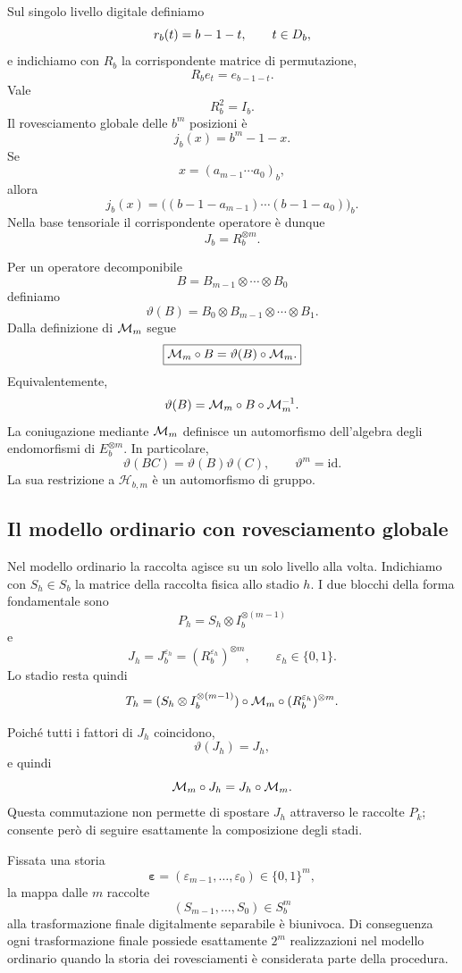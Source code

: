 	Sul singolo livello digitale definiamo
	\[
	r_b(t)=b-1-t,
	\qquad
	t\in D_b,
	\]
	e indichiamo con \(R_b\) la corrispondente matrice di permutazione,
	\[
	R_be_t=e_{b-1-t}.
	\]
	Vale
	\[
	R_b^2=I_b.
	\]
	Il rovesciamento globale delle \(b^m\) posizioni è
	\[
	j_b(x)=b^m-1-x.
	\]
	Se
	\[
	x=(a_{m-1}\cdots a_0)_b,
	\]
	allora
	\[
	j_b(x)
	=
	\bigl(
	(b-1-a_{m-1})\cdots(b-1-a_0)
	\bigr)_b.
	\]
	Nella base tensoriale il corrispondente operatore è dunque
	\[
	J_b
	=
	R_b^{\otimes m}.
	\]

	Per un operatore decomponibile
	\[
	B
	=
	B_{m-1}\otimes\cdots\otimes B_0
	\]
	definiamo
	\[
	\vartheta(B)
	=
	B_0\otimes B_{m-1}\otimes\cdots\otimes B_1.
	\]
	Dalla definizione di \(\mathcal M_m\) segue
	\[
	\boxed{
	\mathcal M_m\circ B
	=
	\vartheta(B)\circ\mathcal M_m.
	}
	\]
	Equivalentemente,
	\[
	\vartheta(B)
	=
	\mathcal M_m\circ B\circ\mathcal M_m^{-1}.
	\]
	La coniugazione mediante \(\mathcal M_m\) definisce un automorfismo
	dell'algebra degli endomorfismi di \(E_b^{\otimes m}\). In particolare,
	\[
	\vartheta(BC)
	=
	\vartheta(B)\vartheta(C),
	\qquad
	\vartheta^m=\mathrm{id}.
	\]
	La sua restrizione a \(\mathcal H_{b,m}\) è un automorfismo di gruppo.


	\subsection{Il modello ordinario con rovesciamento globale}

	Nel modello ordinario la raccolta agisce su un solo livello alla volta.
	Indichiamo con \(S_h\in S_b\) la matrice della raccolta fisica allo stadio
	\(h\). I due blocchi della forma fondamentale sono
	\[
	P_h
	=
	S_h\otimes I_b^{\otimes(m-1)}
	\]
	e
	\[
	J_h
	=
	J_b^{\varepsilon_h}
	=
	(R_b^{\varepsilon_h})^{\otimes m},
	\qquad
	\varepsilon_h\in\{0,1\}.
	\]
	Lo stadio resta quindi
	\[
		T_h
	=
	(S_h\otimes I_b^{\otimes(m-1)})
	\circ\mathcal M_m\circ
	(R_b^{\varepsilon_h})^{\otimes m}.
	\]

	Poiché tutti i fattori di \(J_h\) coincidono,
	\[
	\vartheta(J_h)=J_h,
	\]
	e quindi
	\[
	\mathcal M_m\circ J_h
	=
	J_h\circ\mathcal M_m.
	\]
	Questa commutazione non permette di spostare \(J_h\) attraverso le raccolte
	\(P_k\); consente però di seguire esattamente la composizione degli stadi.

	\begin{proposition}
		\label{prop:molteplicita-ordinaria}
		Fissata una storia
		\[
		\boldsymbol{\varepsilon}
		=
		(\varepsilon_{m-1},\dots,\varepsilon_0)
		\in\{0,1\}^m,
		\]
		la mappa dalle \(m\) raccolte
		\[
		(S_{m-1},\dots,S_0)\in S_b^m
		\]
		alla trasformazione finale digitalmente separabile è biunivoca.
		Di conseguenza ogni trasformazione finale possiede esattamente
		\(2^m\) realizzazioni nel modello ordinario quando la storia dei
		rovesciamenti è considerata parte della procedura.
	\end{proposition}

